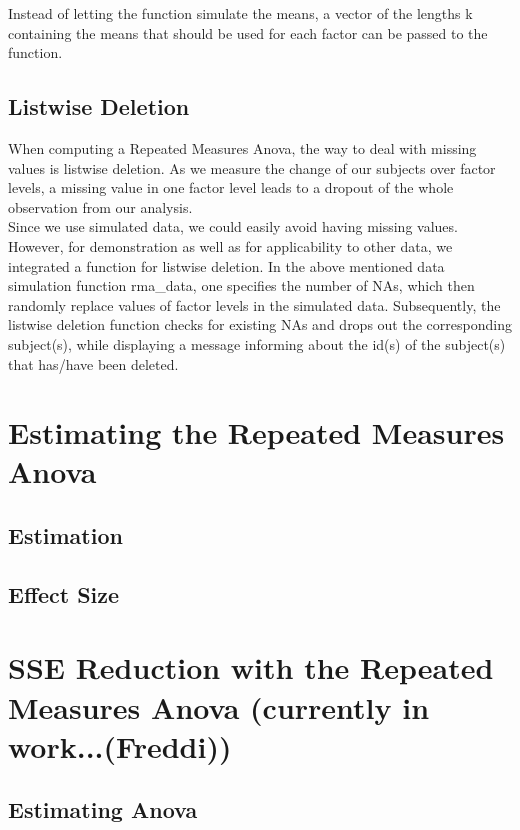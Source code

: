\documentclass[11pt]{article}
\begin{document}
				 Instead of letting the function simulate the means, a vector of the lengths k containing the means that should be used for each factor can be passed to the function.   
				 
		\subsection{Listwise Deletion}
				 When computing a Repeated Measures Anova, the way to deal with missing values is listwise deletion. As we measure the change of our subjects over factor levels, a missing value in one factor level leads to a dropout of the whole observation from our analysis.\\
				
				Since we use simulated data, we could easily avoid having missing values. However, for demonstration as well as for applicability to other data, we integrated a function for listwise deletion. In the above mentioned data simulation function rma\_data, one specifies the number of NAs, which then randomly replace values of factor levels in the simulated data. Subsequently, the listwise deletion function checks for existing NAs and drops out the corresponding subject(s), while displaying a message informing about the id(s) of the subject(s) that has/have been deleted.
				 
	
			
				
	\section{Estimating the Repeated Measures Anova} 
		\subsection{Estimation}
	
		\subsection{Effect Size}
	
	
		
	\section{SSE Reduction with the Repeated Measures Anova  (currently in work...(Freddi)) }
			
		\subsection{Estimating Anova}
							
\end{document}
